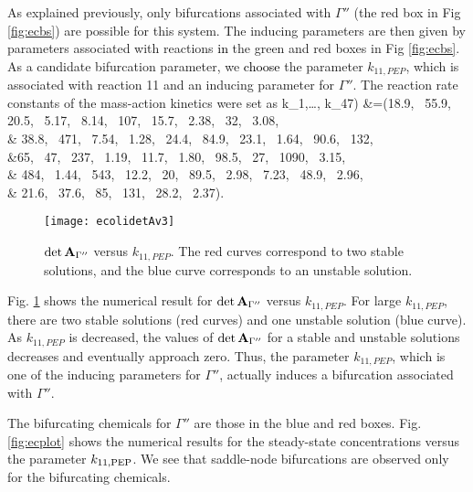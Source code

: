 \documentclass[ amsmath,amssymb,nofootinbib
]{revtex4-1}
\def\bal#1\eal{\begin{align}#1\end{align}}
\newcommand{\non}{\nonumber}
\newcommand{\detA}{{\rm det}\,  {\bf A}}
\newcommand{\green}[1]{\textcolor{black}{#1}}
\begin{document}
As explained previously, only bifurcations associated with $\Gamma''$ (the red box in Fig \ref{fig:ecbs}) are possible for this system. The inducing parameters  are then  given by  parameters associated with  reactions \green{in} the green and red boxes in  Fig \ref{fig:ecbs}. 
As a candidate bifurcation parameter, we \green{choose}  the parameter $ k_{11,PEP}$, which is associated with reaction 11 and an inducing parameter for $\Gamma''$. The reaction rate constants of the mass-action kinetics were set as 
{\small
\bal
(k_1,\ldots, k_{47}) &=(18.9, \, 55.9, \, 20.5, \, 5.17, \, 8.14, \, 107, \, 15.7, \, 2.38, \, 32, \, 3.08, \,
 \non\\& 38.8, \,  471, \, 7.54, \, 1.28, \, 24.4, \, 84.9, \, 23.1, \, 1.64, \, 90.6, \, 132, \, 
 \non\\&65, \, 47, \, 237, \, 1.19, \, 11.7, \,  1.80, \, 98.5, \, 27, \,  1090, \, 3.15, \, 
 \non\\& 484, \, 1.44, \, 543, \, 12.2, \, 20, \,  89.5, \, 2.98, \, 7.23, \,  48.9, \, 2.96, \,
 \non\\& 21.6, \, 37.6, \, 85, \, 131, \, 28.2, \, 2.37).
\eal
}
 \begin{figure}[h]
\center
\texttt{[image: ecolidetAv3]}
\caption{ $\detA_{\Gamma''}$ versus $ k_{11,PEP}$. The  red curves correspond to two stable solutions, and the  blue curve corresponds to an unstable solution.   }
\label{fig:detAec}
\end{figure}

 Fig. \ref{fig:detAec} shows the numerical result for $\detA_{\Gamma''}$ versus  $ k_{11,PEP}$.  For large $ k_{11,PEP}$, there are two stable solutions (red curves) and one unstable solution (blue curve). As $ k_{11,PEP}$ is decreased,  the values of $\detA_{\Gamma''}$ for a stable and unstable solutions decreases and eventually approach zero. Thus, the parameter $ k_{11,PEP}$, which is one of the inducing parameters for $\Gamma''$,  actually induces a bifurcation associated with $\Gamma''$. 

The bifurcating chemicals for $\Gamma''$ are those in the blue and red boxes.  Fig. \ref{fig:ecplot} shows the numerical results for the steady-state concentrations versus the parameter $ k_{11,\rm PEP}$. We see that  saddle-node bifurcations are observed only for the bifurcating chemicals. %
\end{document}

